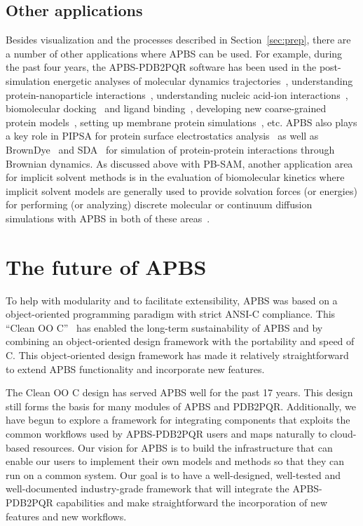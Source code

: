 \documentclass[12pt,titlepage]{article}
\begin{document}
\subsection{Other applications}
Besides visualization and the processes described in Section~\ref{sec:prep}, there are a number of other applications where APBS can be used.
For example, during the past four years, the APBS-PDB2PQR software has been used in the post-simulation energetic analyses of molecular dynamics trajectories~\cite{Dror2013}, understanding protein-nanoparticle interactions~\cite{Treuel2013, DePaoli2014}, understanding nucleic acid-ion interactions~\cite{Lipfert2014}, biomolecular docking~\cite{Roberts2013} and ligand binding~\cite{Evangelidis2009}, developing new coarse-grained protein models~\cite{Spiga2013}, setting up membrane protein simulations~\cite{Stansfeld2015}, etc.
APBS also plays a key role in PIPSA for protein surface electrostatics analysis~\cite{Richter2008} as well as BrownDye~\cite{BrownDye} and SDA~\cite{Martinez2015} for simulation of protein-protein interactions through Brownian dynamics.
As discussed above with PB-SAM, another application area for implicit solvent methods is in the evaluation of biomolecular kinetics where implicit solvent models are generally used to provide solvation forces (or energies) for performing (or analyzing) discrete molecular or continuum diffusion simulations with APBS in both of these areas~\cite{Dror2013, Martinez2015, Cheng2007, Cheng2007a, Song2004a, Song2004a, Elcock2004, Mereghetti2012}.

\section{The future of APBS}
To help with modularity and to facilitate extensibility, APBS was based on a object-oriented programming paradigm with strict ANSI-C compliance.
This ``Clean OO C''~\cite{CleanOOC} has enabled the long-term sustainability of APBS and by combining an object-oriented design framework with the portability and speed of C.
This object-oriented design framework has made it relatively straightforward to extend APBS functionality and incorporate new features.

The Clean OO C design has served APBS well for the past 17 years.
This design still forms the basis for many modules of APBS and PDB2PQR.
Additionally, we have begun to explore a framework for integrating components that exploits the common workflows used by APBS-PDB2PQR users and maps naturally to cloud-based resources.
Our vision for APBS is to build the infrastructure that can enable our users to implement their own models and methods so that they can run on a common system.
Our goal is to have a well-designed, well-tested and well-documented industry-grade framework that will integrate the APBS-PDB2PQR capabilities and make straightforward the incorporation of new features and new workflows.
\end{document}
